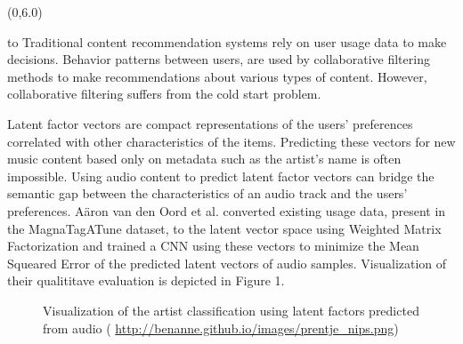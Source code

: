 \documentclass[a0]{a0poster}
\def\Head#1{
  \noindent\hbox to \hsize{\hfil{\LARGE\color{DarkBlue}\sf #1}}\bigskip}
\begin{document}
  \begin{textblock}{7}(0,6.0)
    \Head{The Problem}
    \sf 
    Traditional content recommendation systems rely on user usage data to make
    decisions. Behavior patterns between users, are used by collaborative
    filtering methods to make recommendations about various types of content.
    However, collaborative filtering suffers from the cold start problem.

    Latent factor vectors are compact representations of the users'
    preferences correlated with other characteristics of the items. Predicting
    these vectors for new music content based only on metadata such as the
    artist's name is often impossible. Using audio content to predict latent
    factor vectors can bridge the semantic gap between the characteristics of
    an audio track and the users' preferences. A\"{a}ron van den Oord et al.
    converted existing usage data, present in the MagnaTagATune dataset, to the
    latent vector space using Weighted Matrix Factorization and trained a CNN
    using these vectors to minimize the Mean Squeared Error of the predicted
    latent vectors of audio samples. Visualization of their qualititave 
    evaluation is depicted in Figure 1.
    \cite{deep-content-based-music-recommendation}
    
    \hspace*{1cm}
    \begin{figure}
      \centering
      \caption{Visualization of the artist classification using latent factors
        predicted from audio (
        \url{http://benanne.github.io/images/prentje\_nips.png})}
    \end{figure}
    \hspace*{1cm}

  \end{textblock}
\end{document}

